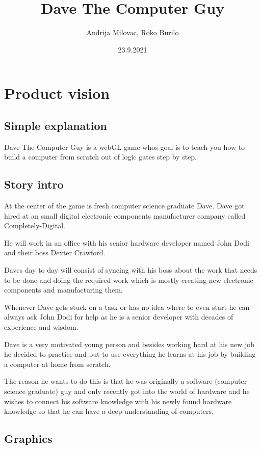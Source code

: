\documentclass[12pt]{article}
\author{Andrija Milovac, Roko Burilo}
\title{Dave The Computer Guy}
\date{23.9.2021}
\begin{document}
\maketitle
\tableofcontents
\section{Product vision}
\subsection{Simple explanation}
Dave The Computer Guy is a webGL game whos goal is to teach you how to build a computer from scratch out of logic gates step by step.
\subsection{Story intro}
At the center of the game is fresh computer science graduate Dave.
Dave got hired at an small digital electronic components manufacturer company called Completely-Digital.

He will work in an office with his senior hardware developer named John Dodi and their boss Dexter Crawford.

Daves day to day will consist of syncing with his boss about the work that needs to be done and doing the required work which is mostly
creating new electronic components and manufacturing them.

Whenever Dave gets stuck on a task or has no idea where to even start he can always ask John Dodi for help as he is a senior developer with
decades of experience and wisdom.

Dave is a very motivated young person and besides working hard at his new job he decided to practice and put to use everything he learns
at his job by building a computer at home from scratch.

The reason he wants to do this is that he was originally a software (computer science graduate) guy and only recently got into the world of hardware and he
wishes to connect his software knowledge with his newly found hardware knowledge so that he can have a deep understanding of computers.

\subsection{Graphics}
\end{document}
